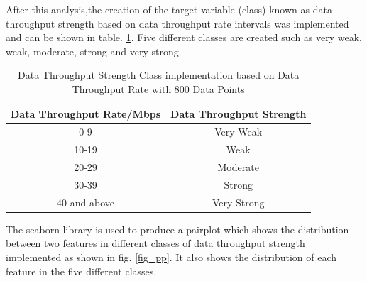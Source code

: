 After this analysis,the creation of the target variable (class) known as data throughput strength based on data throughput rate intervals was implemented and can be shown in table. \ref{table:class}. Five different classes are created such as very weak, weak, moderate, strong and very strong.

\begin{table}[ht]
\centering
\begin{center}
\begin{tabular}{ |c|c| } 
 \hline
 Data Throughput Rate/Mbps & Data Throughput Strength\\ 
  \hline\hline
 0-9 & Very Weak\\ 
 10-19 & Weak\\ 
 20-29 & Moderate \\ 
 30-39 & Strong\\ 
 40 and above & Very Strong\\ 

 \hline
\end{tabular}
\caption{Data Throughput Strength Class implementation based on Data Throughput Rate with 800 Data Points}
\label{table:class}
\end{center}
\end{table}

The seaborn library is used to produce a pairplot which shows the distribution between two features in different classes of data throughput strength implemented as shown in fig. \ref{fig_pp}. It also shows the distribution of each feature in the five different classes.

